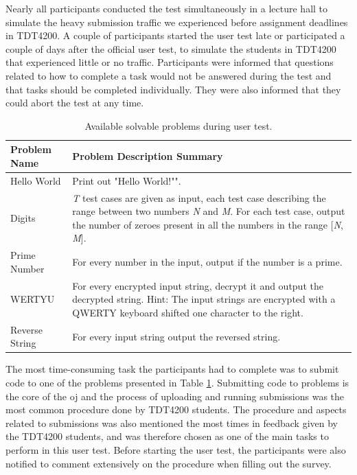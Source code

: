Nearly all participants conducted the test simultaneously in a lecture hall to simulate the heavy submission traffic we experienced before assignment deadlines in TDT4200. A couple of participants started the user test late or participated a couple of days after the official user test, to simulate the students in TDT4200 that experienced little or no traffic. Participants were informed that questions related to how to complete a task would not be answered during the test and that tasks should be completed individually. They were also informed that they could abort the test at any time. \\

\begin{table}
    \centering
    \begin{tabular}{ | l | p{6cm} |}
    \hline
    \textbf{Problem Name} & \textbf{Problem Description Summary} \\ \hline
    Hello World & Print out "Hello World!"". \\ \hline
    Digits & \textit{T} test cases are given as input, each test case describing the range between two numbers \textit{N} and \textit{M}. For each test case, output the number of zeroes present in all the numbers in the range [\textit{N}, \textit{M}]. \\ \hline
    Prime Number & For every number in the input, output if the number is a prime. \\ \hline
    WERTYU & For every encrypted input string, decrypt it and output the decrypted string. Hint: The input strings are encrypted with a QWERTY keyboard shifted one character to the right. \\ \hline
    Reverse String & For every input string output the reversed string. \\
    \hline
    \end{tabular}
    \caption{Available solvable problems during user test.}
    \label{tab:avail-prob}
\end{table}

The most time-consuming task the participants had to complete was to submit code to one of the problems presented in Table \ref{tab:avail-prob}. Submitting code to problems is the core of the \gls{oj} and the process of uploading and running submissions was the most common procedure done by TDT4200 students. The procedure and aspects related to submissions was also mentioned the most times in feedback given by the TDT4200 students, and was therefore chosen as one of the main tasks to perform in this user test. Before starting the user test, the participants were also notified to comment extensively on the procedure when filling out the survey. \\

